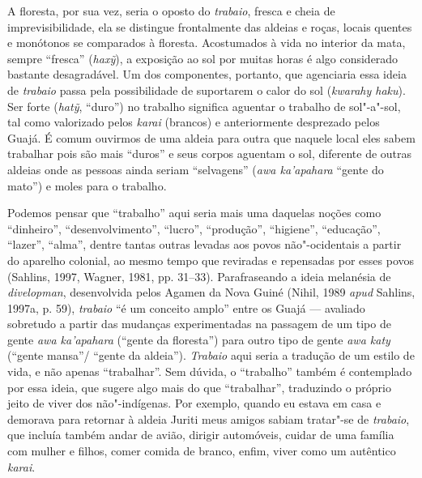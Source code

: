 A floresta, por sua vez, seria o oposto do \emph{trabaio}, fresca e
cheia de imprevisibilidade, ela se distingue frontalmente das aldeias e
roças, locais quentes e monótonos se comparados à floresta. Acostumados
à vida no interior da mata, sempre ``fresca'' (\emph{haxỹ}), a
exposição ao sol por muitas horas é algo considerado bastante
desagradável. Um dos componentes, portanto, que agenciaria essa ideia de
\emph{trabaio} passa pela possibilidade de suportarem o calor do sol
(\emph{kwarahy haku}). Ser forte (\emph{hatỹ}, ``duro'') no trabalho
significa aguentar o trabalho de sol"-a"-sol, tal como valorizado pelos
\emph{karai} (brancos) e anteriormente desprezado pelos Guajá. É comum
ouvirmos de uma aldeia para outra que naquele local eles sabem trabalhar
pois são mais ``duros'' e seus corpos aguentam o sol, diferente de
outras aldeias onde as pessoas ainda seriam ``selvagens'' (\emph{awa
ka'apahara} ``gente do mato'') e moles para o trabalho.

Podemos pensar que ``trabalho'' aqui seria mais uma daquelas noções como
``dinheiro'', ``desenvolvimento'', ``lucro'', ``produção'', ``higiene'',
``educação'', ``lazer'', ``alma'', dentre tantas outras levadas aos
povos não"-ocidentais a partir do aparelho colonial, ao mesmo tempo que
reviradas e repensadas por esses povos (Sahlins, 1997, Wagner, 1981, pp.
31--33). Parafraseando a ideia melanésia de \emph{divelopman},
desenvolvida pelos Agamen da Nova Guiné (Nihil, 1989 \emph{apud} Sahlins, 1997a,
p. 59), \emph{trabaio} ``é um conceito amplo'' entre os Guajá --- avaliado
sobretudo a partir das mudanças experimentadas na passagem de um tipo de
gente \emph{awa ka'apahara} (``gente da floresta'') para outro tipo de
gente \emph{awa katy} (``gente mansa''/ ``gente da aldeia'').
\emph{Trabaio} aqui seria a tradução de um estilo de vida, e não apenas
``trabalhar''. Sem dúvida, o ``trabalho'' também é contemplado por essa
ideia, que sugere algo mais do que ``trabalhar'', traduzindo o próprio
jeito de viver dos não"-indígenas. Por exemplo, quando eu estava em casa
e demorava para retornar à aldeia Juriti meus amigos sabiam tratar"-se de
\emph{trabaio}, que incluía também andar de avião, dirigir automóveis,
cuidar de uma família com mulher e filhos, comer comida de branco,
enfim, viver como um autêntico \emph{karai}.

